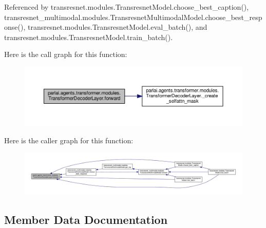 Referenced by transresnet.\+modules.\+Transresnet\+Model.\+choose\+\_\+best\+\_\+caption(), transresnet\+\_\+multimodal.\+modules.\+Transresnet\+Multimodal\+Model.\+choose\+\_\+best\+\_\+response(), transresnet.\+modules.\+Transresnet\+Model.\+eval\+\_\+batch(), and transresnet.\+modules.\+Transresnet\+Model.\+train\+\_\+batch().

Here is the call graph for this function\+:
\nopagebreak
\begin{figure}[H]
\begin{center}
\leavevmode
\includegraphics[width=350pt]{classparlai_1_1agents_1_1transformer_1_1modules_1_1TransformerDecoderLayer_ad0a63d90190682d0f9ff325fcf60f426_cgraph}
\end{center}
\end{figure}
Here is the caller graph for this function\+:
\nopagebreak
\begin{figure}[H]
\begin{center}
\leavevmode
\includegraphics[width=350pt]{classparlai_1_1agents_1_1transformer_1_1modules_1_1TransformerDecoderLayer_ad0a63d90190682d0f9ff325fcf60f426_icgraph}
\end{center}
\end{figure}


\subsection{Member Data Documentation}
\mbox{\label{classparlai_1_1agents_1_1transformer_1_1modules_1_1TransformerDecoderLayer_a33276633e128020853db98128f1d93c3}} 
